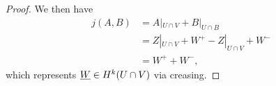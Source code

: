 \begin{proof}
We then have
\begin{align*}
j(A,B)&= A|_{U\cap V}+B|_{U\cap B}\\
&=Z|_{U\cap V}+ W^+ - Z|_{U\cap V} +W^-\\
&=W^++W^-,
\end{align*}
which represents $\underline{W}\in H^k(U\cap V)$ via creasing.
\end{proof}

